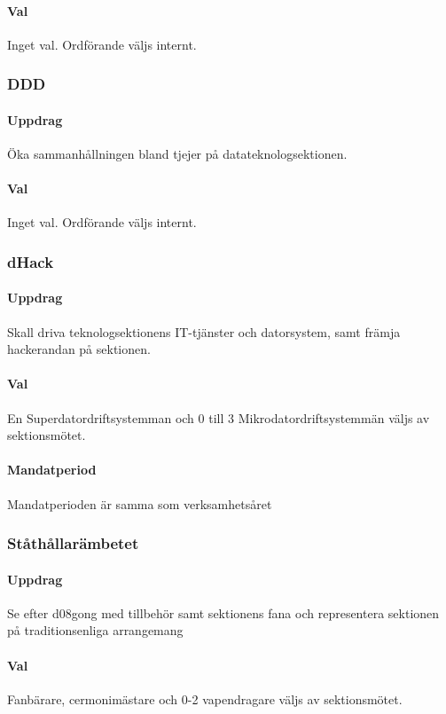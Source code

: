 \documentclass[a4paper, 10pt]{article}
\begin{document}
\paragraph{Val\\}
Inget val. Ordförande väljs internt. 
\subsubsection{DDD}
\paragraph{Uppdrag\\}
Öka sammanhållningen bland tjejer på datateknologsektionen. 
\paragraph{Val\\}
Inget val. Ordförande väljs internt.
\subsubsection{dHack}
\paragraph{Uppdrag\\}
Skall driva teknologsektionens IT-tjänster och datorsystem, samt
främja hackerandan på sektionen.
\paragraph{Val\\}
En Superdatordriftsystemman och 0 till 3 Mikrodatordriftsystemmän väljs av sektionsmötet.
\paragraph{Mandatperiod\\}
Mandatperioden är samma som verksamhetsåret
\subsubsection{Ståthållarämbetet}
\paragraph{Uppdrag\\}
Se efter d08gong med tillbehör samt sektionens fana och representera sektionen på traditionsenliga arrangemang
\paragraph{Val\\}
Fanbärare, cermonimästare och 0-2 vapendragare väljs av sektionsmötet.
\end{document}
